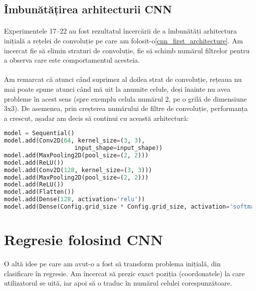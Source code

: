 \subsection{Îmbunătățirea arhitecturii CNN}
\paragraph{}
Experimentele 17–22 au fost rezultatul încercării de a îmbunătăți arhitectura inițială a rețelei de convoluție pe care am folosit-o\ref{cnn_first_architecture}.
Am incercat fie să elimin straturi de convoluție, fie să schimb numărul filtrelor pentru a observa care este comportamentul acesteia.

\paragraph{}
Am remarcat că atunci când suprimez al doilea strat de convoluție, rețeaua nu mai poate spune atunci când mă uit la anumite celule, deși înainte nu avea probleme în acest sens (spre exemplu celula numărul 2, pe o grilă de dimensiune 3x3).
De asemenea, prin creșterea numărului de filtre de convoluție, performanța a crescut, așadar am decis să continui cu această arhitectură:

\begin{lstlisting}[language=Python, caption=Arhitectura CNN îmbunătățită]
model = Sequential()
model.add(Conv2D(64, kernel_size=(3, 3),
                    input_shape=input_shape))
model.add(MaxPooling2D(pool_size=(2, 2)))
model.add(ReLU())
model.add(Conv2D(128, kernel_size=(3, 3)))
model.add(MaxPooling2D(pool_size=(2, 2)))
model.add(ReLU())
model.add(Flatten())
model.add(Dense(128, activation='relu'))
model.add(Dense(Config.grid_size * Config.grid_size, activation='softmax'))
\end{lstlisting}

\section{Regresie folosind CNN}
\paragraph{}
O altă idee pe care am avut-o a fost să transform problema inițială, din clasificare în regresie.
Am încercat să prezic exact poziția (coordonatele) la care utilizatorul se uită, iar apoi să o traduc în numărul celulei corespunzătoare.

